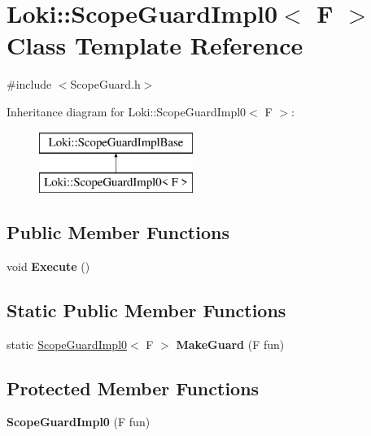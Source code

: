 \hypertarget{classLoki_1_1ScopeGuardImpl0}{}\section{Loki\+:\+:Scope\+Guard\+Impl0$<$ F $>$ Class Template Reference}
\label{classLoki_1_1ScopeGuardImpl0}


{\ttfamily \#include $<$Scope\+Guard.\+h$>$}

Inheritance diagram for Loki\+:\+:Scope\+Guard\+Impl0$<$ F $>$\+:\begin{figure}[H]
\begin{center}
\leavevmode
\includegraphics[height=2.000000cm]{classLoki_1_1ScopeGuardImpl0}
\end{center}
\end{figure}
\subsection*{Public Member Functions}
\begin{DoxyCompactItemize}
\item 
\hypertarget{classLoki_1_1ScopeGuardImpl0_a126213b15e98ef529e36edf3b8c3fa75}{}void {\bfseries Execute} ()\label{classLoki_1_1ScopeGuardImpl0_a126213b15e98ef529e36edf3b8c3fa75}

\end{DoxyCompactItemize}
\subsection*{Static Public Member Functions}
\begin{DoxyCompactItemize}
\item 
\hypertarget{classLoki_1_1ScopeGuardImpl0_af8351db2ac1b36e41037f7d8579f206a}{}static \hyperlink{classLoki_1_1ScopeGuardImpl0}{Scope\+Guard\+Impl0}$<$ F $>$ {\bfseries Make\+Guard} (F fun)\label{classLoki_1_1ScopeGuardImpl0_af8351db2ac1b36e41037f7d8579f206a}

\end{DoxyCompactItemize}
\subsection*{Protected Member Functions}
\begin{DoxyCompactItemize}
\item 
\hypertarget{classLoki_1_1ScopeGuardImpl0_a0f0bb6916d1a1d0e31da08cd0c57c529}{}{\bfseries Scope\+Guard\+Impl0} (F fun)\label{classLoki_1_1ScopeGuardImpl0_a0f0bb6916d1a1d0e31da08cd0c57c529}

\end{DoxyCompactItemize}
